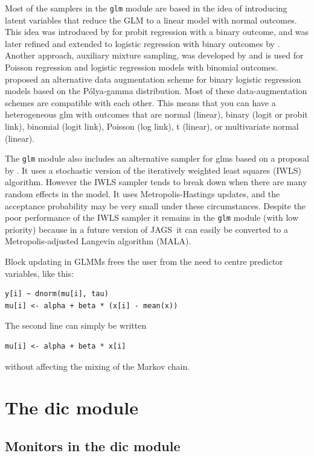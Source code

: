\documentclass[11pt, a4paper, titlepage]{report}
\newcommand{\JAGS}{\textsf{JAGS}}
\begin{document}
Most of the samplers in the \texttt{glm} module are based in the idea
of introducing latent variables that reduce the GLM to a linear model
with normal outcomes. This idea was introduced by \citet{AlbertChib93}
for probit regression with a binary outcome, and was later refined and
extended to logistic regression with binary outcomes by
\citet{HolmesHeld06}. Another approach, auxiliary mixture sampling,
was developed by \citet{Fruhwirth-Schnatter09} and is used for Poisson
regression and logistic regression models with binomial outcomes.
\citet{PolsonEtal2013} proposed an alternative data augmentation
scheme for binary logistic regression models based on the
P\'{o}lya-gamma distribution. Most of these data-augmentation schemes
are compatible with each other. This means that you can have a
heterogeneous glm with outcomes that are normal (linear), binary
(logit or probit link), binomial (logit link), Poisson (log link),
t (linear), or multivariate normal (linear).

The \texttt{glm} module also includes an alternative sampler for glms
based on a proposal by \citet{Gamerman97}. It uses a stochastic
version of the iteratively weighted least squares (IWLS)
algorithm. However the IWLS sampler tends to break down when there are
many random effects in the model. It uses Metropolis-Hastings updates,
and the acceptance probability may be very small under these
circumstances. Despite the poor performance of the IWLS sampler it
remains in the \texttt{glm} module (with low priority) because in a
future version of \JAGS\ it can easily be converted to a
Metropolis-adjusted Langevin algorithm (MALA).

Block updating in GLMMs frees the user from the need to centre
predictor variables, like this:
\begin{verbatim}
y[i] ~ dnorm(mu[i], tau)
mu[i] <- alpha + beta * (x[i] - mean(x))
\end{verbatim}
The second line can simply be written
\begin{verbatim}
mu[i] <- alpha + beta * x[i]
\end{verbatim}
without affecting the mixing of the Markov chain.  


\chapter{The dic module}
\label{chapter:dic}

\section{Monitors in the dic module}
\end{document}
